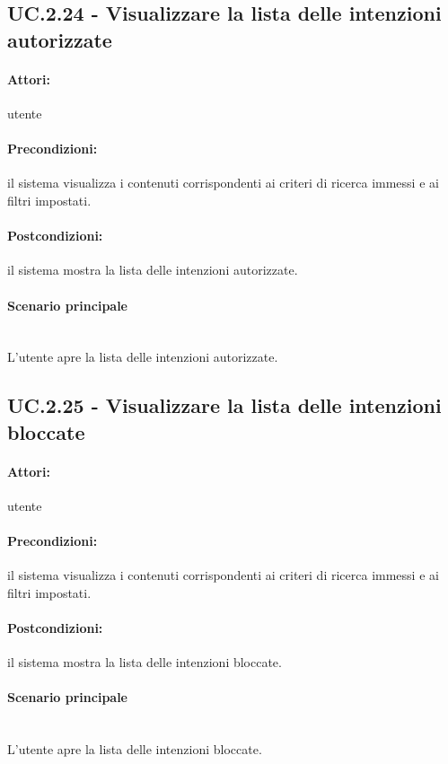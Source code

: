\documentclass[10pt,a4paper,headinclude,footinclude,hidelinks]{scrreprt} %
\begin{document}
	\subsection[UC.2.24]{UC.2.24 - Visualizzare la lista delle intenzioni autorizzate}
	\label{sec:stage:ar:uc:2_24}
	\paragraph{Attori:} utente
	\paragraph{Precondizioni:} il sistema visualizza i contenuti corrispondenti ai criteri di ricerca immessi e ai filtri impostati.
	\paragraph{Postcondizioni:} il sistema mostra la lista delle intenzioni autorizzate.
	\paragraph{Scenario principale} \hfill \\
	L'utente apre la lista delle intenzioni autorizzate.

	\subsection[UC.2.25]{UC.2.25 - Visualizzare la lista delle intenzioni bloccate}
	\label{sec:stage:ar:uc:2_25}
	\paragraph{Attori:} utente
	\paragraph{Precondizioni:} il sistema visualizza i contenuti corrispondenti ai criteri di ricerca immessi e ai filtri impostati.
	\paragraph{Postcondizioni:} il sistema mostra la lista delle intenzioni bloccate.
	\paragraph{Scenario principale} \hfill \\
	L'utente apre la lista delle intenzioni bloccate.
\end{document}
